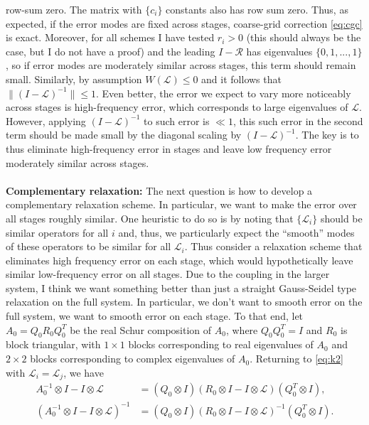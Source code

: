 \documentclass[a4paper,10pt]{article}
\begin{document}
row-sum zero. The matrix with $\{c_i\}$ constants also has row sum zero. Thus,
as expected, if the error modes are fixed across stages, coarse-grid correction
\eqref{eq:cgc} is exact. Moreover, for all schemes I have tested $r_i > 0$ (this
should always be the case, but I do not have a proof) and the leading
$I - \mathcal{R}$ has eigenvalues $\{0,1,...,1\}$, so if error modes are
moderately similar across stages, this term should remain small. Similarly,
by assumption $W(\mathcal{L}) \leq 0$ and it follows that
$\|(I - \mathcal{L})^{-1}\| \leq 1$. Even better, the error we expect
to vary more noticeably across stages is high-frequency error, which
corresponds to large eigenvalues of $\mathcal{L}$. However, applying 
$(I - \mathcal{L})^{-1}$ to such error is $\ll 1$, this such error in
the second term should be made small by the diagonal scaling by
$(I - \mathcal{L})^{-1}$. The key is to thus eliminate high-frequency
error in stages and leave low frequency error moderately similar across
stages.\\
\\
\textbf{Complementary relaxation:}
The next question is how to develop a complementary relaxation scheme. In
particular, we want to make the error over all stages roughly similar. One
heuristic to do so is by noting that $\{\mathcal{L}_i\}$ should be similar operators
for all $i$ and, thus, we particularly expect the ``smooth'' modes of these
operators to be similar for all $\mathcal{L}_i$. Thus consider a relaxation
scheme that eliminates high frequency error on each stage, which would
hypothetically leave similar low-frequency error on all stages. Due to 
the coupling in the larger system, I think we want something better than
just a straight Gauss-Seidel type relaxation on the full system. In
particular, we don't want to smooth error on the full system, we want
to smooth error on each stage. To that end, let $A_0 = Q_0R_0Q_0^T$
be the real Schur composition of $A_0$, where $Q_0Q_0^T = I$ and $R_0$
is block triangular, with $1\times 1$ blocks corresponding to real
eigenvalues of $A_0$ and $2\times 2$ blocks corresponding to complex
eigenvalues of $A_0$. Returning to \eqref{eq:k2} with $\mathcal{L}_i =
\mathcal{L}_j$, we have
%
\begin{align}\nonumber
A_0^{-1}\otimes I - I\otimes \mathcal{L}
	& = (Q_0\otimes I) \left( R_0\otimes I -I\otimes \mathcal{L}\right)(Q_0^T\otimes I), \\
\left( A_0^{-1}\otimes I -I\otimes \mathcal{L}\right)^{-1}
	& = (Q_0\otimes I) \left( R_0\otimes I - I\otimes \mathcal{L}\right)^{-1}(Q_0^T\otimes I).
	\label{eq:inv_kron}
\end{align}
\end{document}
